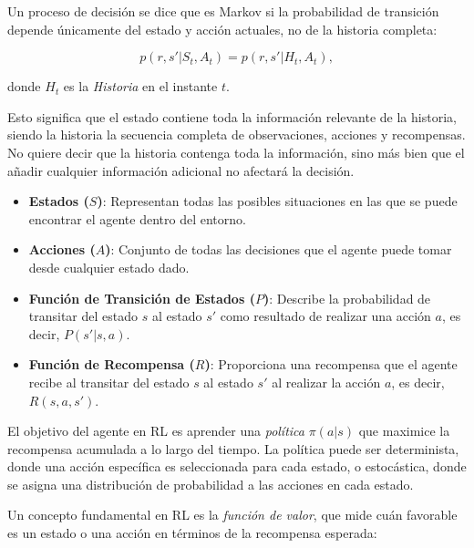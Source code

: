 \documentclass[a4paper,12pt, twoside]{report}
\begin{document}
Un proceso de decisión se dice que es Markov si la probabilidad de transición depende únicamente
del estado y acción actuales, no de la historia completa:

\begin{equation}
p(r, s' | S_t, A_t) = p(r, s' | H_t, A_t),
\end{equation}

donde $H_t$ es la \textit{Historia} en el instante $t$.

Esto significa que el estado contiene toda la información relevante de la historia, siendo la historia 
la secuencia completa de observaciones, acciones y recompensas. No quiere decir que la historia contenga
toda la información, sino más bien que el añadir cualquier información adicional no afectará la decisión.

\begin{itemize}
    \item \textbf{Estados (\(S\))}: Representan todas las posibles situaciones en las que se puede 
    encontrar el agente dentro del entorno.
    \item \textbf{Acciones (\(A\))}: Conjunto de todas las decisiones que el agente puede tomar 
    desde cualquier estado dado.
    \item \textbf{Función de Transición de Estados (\(P\))}: Describe la probabilidad de transitar 
    del estado \(s\) al estado \(s'\) como resultado de realizar una acción \(a\), es decir, \(P(s'|s, a)\).
    \item \textbf{Función de Recompensa (\(R\))}: Proporciona una recompensa que el agente 
    recibe al transitar del estado \(s\) al estado \(s'\) al realizar la acción \(a\), es decir, \(R(s, a, s')\).
\end{itemize}

El objetivo del agente en RL es aprender una \textit{política} \(\pi(a|s)\) que maximice la recompensa 
acumulada a lo largo del tiempo. La política puede ser determinista, donde una acción específica es 
seleccionada para cada estado, o estocástica, donde se asigna una distribución de probabilidad a las
acciones en cada estado.

Un concepto fundamental en RL es la \textit{función de valor}, que mide cuán favorable es un estado 
o una acción en términos de la recompensa esperada:
\end{document}
